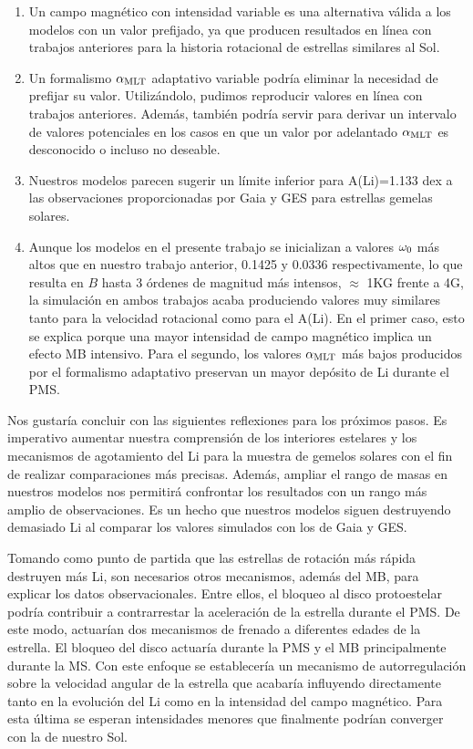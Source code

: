 \begin{enumerate}
	\item Un campo magnético con intensidad variable es una alternativa válida a los modelos con un valor prefijado, ya que producen resultados en línea con trabajos anteriores para la historia rotacional de estrellas similares al Sol.
	\item Un formalismo $\alpha_{\mathrm{MLT}}$ adaptativo variable podría eliminar la necesidad de prefijar su valor. Utilizándolo, pudimos reproducir valores en línea con trabajos anteriores. Además, también podría servir para derivar un intervalo de valores potenciales en los casos en que un valor por adelantado $\alpha_{\mathrm{MLT}}$ es desconocido o incluso no deseable.
	\item Nuestros modelos parecen sugerir un límite inferior para A(Li)=1.133 dex a las observaciones proporcionadas por Gaia y GES para estrellas gemelas solares.   
	\item Aunque los modelos en el presente trabajo se inicializan a valores $\omega_{\mathrm{0}}$ más altos que en nuestro trabajo anterior, 0.1425 y 0.0336 respectivamente, lo que resulta en $B$ hasta 3 órdenes de magnitud más intensos, $\approx$ 1KG frente a 4G, la simulación en ambos trabajos acaba produciendo valores muy similares tanto para la velocidad rotacional como para el A(Li). En el primer caso, esto se explica porque una mayor intensidad de campo magnético implica un efecto MB intensivo. Para el segundo, los valores $\alpha_{\mathrm{MLT}}$ más bajos producidos por el formalismo adaptativo preservan un mayor depósito de Li durante el PMS.
\end{enumerate}


Nos gustaría concluir con las siguientes reflexiones para los próximos pasos. Es imperativo aumentar nuestra comprensión de los interiores estelares y los mecanismos de agotamiento del Li para la muestra de gemelos solares con el fin de realizar comparaciones más precisas. Además, ampliar el rango de masas en nuestros modelos nos permitirá confrontar los resultados con un rango más amplio de observaciones. Es un hecho que nuestros modelos siguen destruyendo demasiado Li al comparar los valores simulados con los de Gaia y GES.\par 

Tomando como punto de partida que las estrellas de rotación más rápida destruyen más Li, son necesarios otros mecanismos, además del MB, para explicar los datos observacionales. Entre ellos, el bloqueo al disco protoestelar podría contribuir a contrarrestar la aceleración de la estrella durante el PMS. De este modo, actuarían dos mecanismos de frenado a diferentes edades de la estrella. El bloqueo del disco actuaría durante la PMS y el MB principalmente durante la MS. Con este enfoque se establecería un mecanismo de autorregulación sobre la velocidad angular de la estrella que acabaría influyendo directamente tanto en la evolución del Li como en la intensidad del campo magnético. Para esta última se esperan intensidades menores que finalmente podrían converger con la de nuestro Sol.\par

